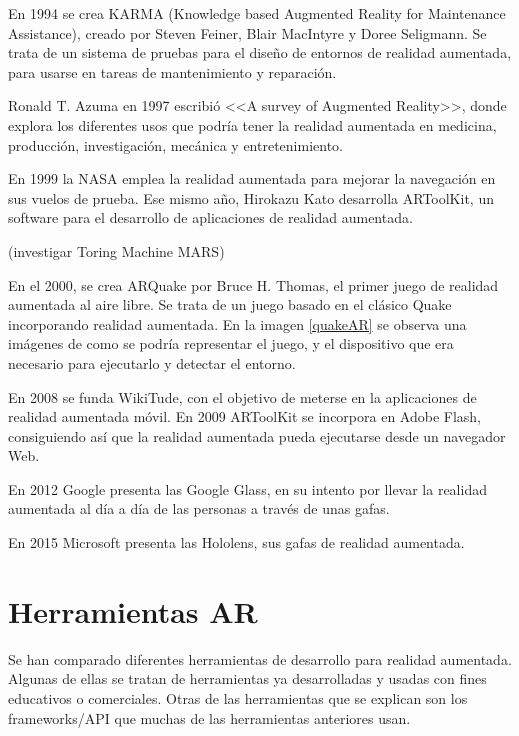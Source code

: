 En 1994 se crea KARMA (Knowledge based Augmented Reality for Maintenance Assistance), creado por  Steven Feiner, Blair MacIntyre y Doree Seligmann. Se trata de un sistema de pruebas para el diseño de entornos de realidad aumentada, para usarse en tareas de mantenimiento y reparación.

Ronald T. Azuma  en 1997 escribió <<A survey of Augmented Reality>>, donde explora los diferentes usos que podría tener la realidad aumentada en medicina, producción, investigación, mecánica y entretenimiento.

En 1999 la NASA emplea la realidad aumentada para mejorar la navegación en sus vuelos de prueba. Ese mismo año, Hirokazu Kato desarrolla ARToolKit, un software para el desarrollo de aplicaciones de realidad aumentada.

(investigar Toring Machine MARS)

En el 2000, se crea ARQuake por Bruce H. Thomas, el primer juego de realidad aumentada al aire libre. Se trata de un juego basado en el clásico Quake incorporando realidad aumentada. En la imagen \ref{quakeAR} se observa una imágenes de como se podría representar el juego, y el dispositivo que era necesario para ejecutarlo y detectar el entorno.

\label{quakeAR}

En 2008 se funda WikiTude, con el objetivo de meterse en la aplicaciones de realidad aumentada móvil. 
En 2009 ARToolKit se incorpora en Adobe Flash, consiguiendo así que la realidad aumentada pueda ejecutarse desde un navegador Web.

En 2012 Google presenta las Google Glass, en su intento por llevar la realidad aumentada al día a día de las personas a través de unas gafas.  

En 2015 Microsoft presenta las Hololens, sus gafas de realidad aumentada.


\section{Herramientas AR}

Se han comparado diferentes herramientas de desarrollo para realidad aumentada. 
Algunas de ellas se tratan de herramientas ya desarrolladas y usadas con fines educativos o comerciales. Otras de las herramientas que se explican son los frameworks/API que muchas de las herramientas anteriores usan.
 


